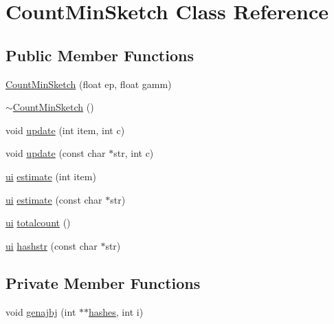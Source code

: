 \hypertarget{classCountMinSketch}{}\section{Count\+Min\+Sketch Class Reference}
\label{classCountMinSketch}
\subsection*{Public Member Functions}
\begin{DoxyCompactItemize}
\item 
\hyperlink{classCountMinSketch_a0258a182a186433fc93ce136d566bb9f}{Count\+Min\+Sketch} (float ep, float gamm)
\item 
\hyperlink{classCountMinSketch_afd5fcf3bbe1ccbee00cd32ff605c96fc}{$\sim$\+Count\+Min\+Sketch} ()
\item 
void \hyperlink{classCountMinSketch_a3f6bcbf75a945ca7ccda17991ef145c3}{update} (int item, int c)
\item 
void \hyperlink{classCountMinSketch_acce9beb4ec1bb8ddb8d97eb4dfb74785}{update} (const char $\ast$str, int c)
\item 
\hyperlink{CountMinSketch_8cpp_a38190f0ee57a4f413c87037ad3bb91c6}{ui} \hyperlink{classCountMinSketch_a97b01c3251247d869ce75c37df6b778f}{estimate} (int item)
\item 
\hyperlink{CountMinSketch_8cpp_a38190f0ee57a4f413c87037ad3bb91c6}{ui} \hyperlink{classCountMinSketch_a4ca4e31be2f7ece94ce7a90ecc9da80c}{estimate} (const char $\ast$str)
\item 
\hyperlink{CountMinSketch_8cpp_a38190f0ee57a4f413c87037ad3bb91c6}{ui} \hyperlink{classCountMinSketch_a39170cd06d86f908cbb427a7f166b1e8}{totalcount} ()
\item 
\hyperlink{CountMinSketch_8cpp_a38190f0ee57a4f413c87037ad3bb91c6}{ui} \hyperlink{classCountMinSketch_ad60583d0353b1c5c10d927a66806da14}{hashstr} (const char $\ast$str)
\end{DoxyCompactItemize}
\subsection*{Private Member Functions}
\begin{DoxyCompactItemize}
\item 
void \hyperlink{classCountMinSketch_a3cbd681c7f2feef2927db7bb218db81b}{genajbj} (int $\ast$$\ast$\hyperlink{classCountMinSketch_abb764dbee3b01e8f35ee27c3ac71dc20}{hashes}, int i)
\end{DoxyCompactItemize}
